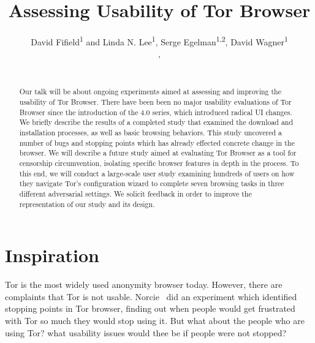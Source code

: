 \documentclass{sig-alternate-hotpets15}
\begin{document}
\title{Assessing Usability of Tor Browser}
\author{
 \alignauthor David Fifield\textsuperscript{1} and Linda N. Lee\textsuperscript{1}, Serge Egelman\textsuperscript{1,2}, David Wagner\textsuperscript{1}\\
   \vspace{0.5em}
   , \\
   \\
}
\maketitle

\begin{abstract}
Our talk will be about ongoing experiments aimed at
assessing and improving the usability of Tor Browser.
There have been been no major usability evaluations of
Tor Browser since the introduction of the 4.0 series,
which introduced radical UI changes.
We briefly describe the results of a completed study
that examined the download and installation processes, 
as well as basic browsing behaviors.
This study uncovered a number of bugs and stopping points
which has already effected concrete change in the browser.
We will describe a future study aimed at
evaluating Tor Browser as a tool for censorship circumvention, isolating specific browser features in depth in the process. 
To this end, we will conduct a large-scale user study examining hundreds of users on how they navigate Tor's configuration wizard to complete seven browsing tasks in three different adversarial settings. 
We solicit feedback in order to improve the representation
of our study and its design.
\end{abstract}


\section{Inspiration}
Tor is the most widely used anonymity browser today. However, there are complaints that Tor is not usable. Norcie~\cite{norcie2012eliminating} did an experiment which identified stopping points in Tor browser, finding out when people would get frustrated with Tor so much they would stop using it. But what about the people who are using Tor? what usability issues would thee be if people were not stopped? 
\end{document}
